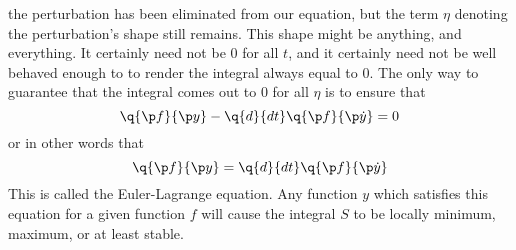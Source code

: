 the perturbation has been eliminated from our equation, but the term $\eta$
denoting the perturbation's shape still remains. This shape might be anything,
and everything. It certainly need not be 0 for all $t$, and it certainly need
not be well behaved enough to to render the integral always equal to 0. The
only way to guarantee that the integral comes out to 0 for all $\eta$ is to
ensure that
$$
\q{\p f}{\p y} - \q{d}{dt}\q{\p f}{\p \dot y} = 0
$$
or in other words that
$$
\q{\p f}{\p y} = \q{d}{dt}\q{\p f}{\p \dot y}
$$
This is called the Euler-Lagrange equation. Any function $y$ which satisfies
this equation for a given function $f$ will cause the integral $S$ to be
locally minimum, maximum, or at least stable.

\bye
